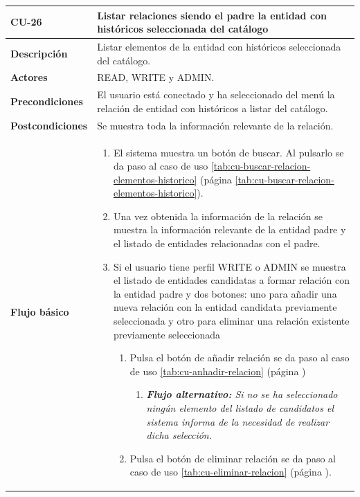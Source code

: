 \begin{table} [H]
    \centering
    \setlength{\leftmargini}{0.4cm}
	\resizebox{15cm}{!} { %
    \begin{tabular}{| m{3cm} | m{12cm} |}   
    \hline
	  \textbf{CU-26} & \textbf{Listar relaciones siendo el padre la entidad con históricos seleccionada del catálogo} \\\hline
	  \textbf{Descripción} & Listar elementos de la entidad con históricos seleccionada del catálogo. \\\hline
	  \textbf{Actores} & READ, WRITE y ADMIN. \\\hline
	  \textbf{Precondiciones} & El usuario está conectado y ha seleccionado del menú la relación de entidad con históricos a listar del catálogo. \\\hline
	  \textbf{Postcondiciones} & Se muestra toda la información relevante de la relación. \\\hline
	  \textbf{Flujo básico} & 
		\begin{enumerate}
	  	\item El sistema muestra un botón de buscar. Al pulsarlo se da paso al caso de uso \ref{tab:cu-buscar-relacion-elementos-historico} (página \ref{tab:cu-buscar-relacion-elementos-historico}).
	  	\item Una vez obtenida la información de la relación se muestra la información relevante de la entidad padre y el listado de entidades relacionadas con el padre.
	  	\item Si el usuario tiene perfil WRITE o ADMIN se muestra el listado de entidades candidatas a formar relación con la entidad padre y dos botones: uno para añadir una nueva relación con la entidad candidata previamente seleccionada y otro para eliminar una relación existente previamente seleccionada
	  	\begin{enumerate}
		        \item Pulsa el botón de añadir relación se da paso al caso de uso \ref{tab:cu-anhadir-relacion} (página \pageref{tab:cu-anhadir-relacion})
					\begin{enumerate}	
			   		\item  \textit{\textbf{Flujo alternativo:} Si no se ha seleccionado ningún elemento del listado de candidatos el sistema informa de la necesidad de realizar dicha selección.}
			   		\end{enumerate}		
		        \item Pulsa el botón de eliminar relación se da paso al caso de uso \ref{tab:cu-eliminar-relacion} (página \pageref{tab:cu-eliminar-relacion}).

\end{enumerate}
\end{enumerate}
\end{tabular}}
\end{table}
